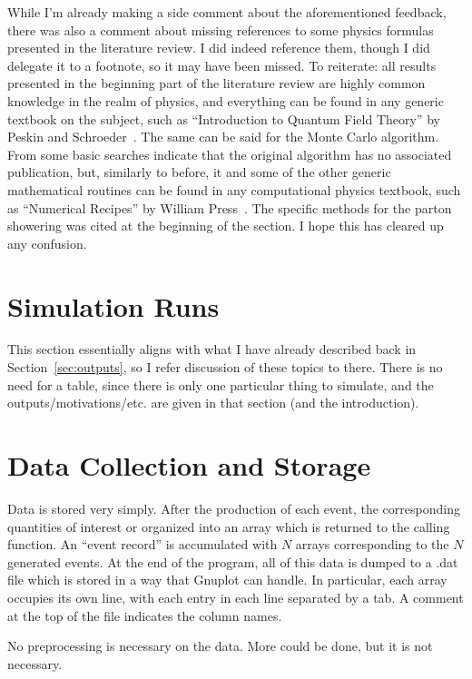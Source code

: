 While I'm already making a side comment about the aforementioned feedback, there was also a comment about missing references to some physics formulas presented in the literature review. I did indeed reference them, though I did delegate it to a footnote, so it may have been missed. To reiterate: all results presented in the beginning part of the literature review are highly common knowledge in the realm of physics, and everything can be found in any generic textbook on the subject, such as ``Introduction to Quantum Field Theory'' by Peskin and Schroeder~\cite{peskin-schroeder}. The same can be said for the Monte Carlo algorithm. From some basic searches indicate that the original algorithm has no associated publication, but, similarly to before, it and some of the other generic mathematical routines can be found in any computational physics textbook, such as ``Numerical Recipes'' by William Press~\cite{Press_2007}. The specific methods for the parton showering was cited at the beginning of the section. I hope this has cleared up any confusion.



\section{Simulation Runs}

This section essentially aligns with what I have already described back in Section~\ref{sec:outputs}, so I refer discussion of these topics to there. There is no need for a table, since there is only one particular thing to simulate, and the outputs/motivations/etc. are given in that section (and the introduction).



\section{Data Collection and Storage}

Data is stored very simply. After the production of each event, the corresponding quantities of interest or organized into an array which is returned to the calling function. An ``event record'' is accumulated with $N$ arrays corresponding to the $N$ generated events. At the end of the program, all of this data is dumped to a .dat file which is stored in a way that Gnuplot can handle. In particular, each array occupies its own line, with each entry in each line separated by a tab. A comment at the top of the file indicates the column names.

No preprocessing is necessary on the data. More could be done, but it is not necessary.


